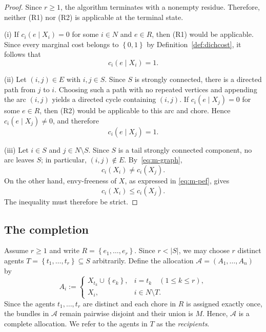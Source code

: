 \documentclass[sigconf,anonymous]{aamas}
\newcommand{\agents}{N}
\newcommand{\items}{M}
\newcommand{\alloc}{\mathcal{A}}
\newcommand{\cost}{c}
\newcommand{\set}[1]{\left\{#1\right\}}
\newcommand{\abs}[1]{\left\lvert#1\right\rvert}
\theoremstyle{acmplain}
\theoremstyle{acmdefinition}
\theoremstyle{acmplain}
\begin{document}
\begin{proof} Since $r\geq 1$, the algorithm terminates with a nonempty residue. Therefore, neither \textnormal{(R1)} nor \textnormal{(R2)} is applicable at the terminal state.

(i) If $\cost_i(e\mid X_i)=0$ for some $i\in\agents$ and $e\in R$, then \textnormal{(R1)} would be applicable. Since every marginal cost belongs to $\set{0,1}$ by Definition~\ref{def:dichcost}, it follows that
\[
    \cost_i(e\mid X_i)=1.
\]

(ii) Let $(i,j)\in E$ with $i,j\in S$. Since $S$ is strongly connected, there is a directed path from $j$ to $i$. Choosing such a path with no repeated vertices and appending the arc $(i,j)$ yields a directed cycle containing $(i,j)$. If $\cost_i(e\mid X_j)=0$ for some $e\in R$, then \textnormal{(R2)} would be applicable to this arc and chore. Hence $\cost_i(e\mid X_j)\neq 0$, and therefore
\[
    \cost_i(e\mid X_j)=1.
\]

(iii) Let $i\in S$ and $j\in\agents\setminus S$. Since $S$ is a tail strongly connected component, no arc leaves $S$; in particular, $(i,j)\notin E$. By~\eqref{eq:m-graph},
\[
    \cost_i(X_i)\neq \cost_i(X_j).
\]
On the other hand, envy-freeness of $X$, as expressed in \eqref{eq:m-pef}, gives
\[
    \cost_i(X_i)\leq \cost_i(X_j).
\]
The inequality must therefore be strict.
\end{proof}
\subsection{The completion}
\label{sec:m-completion}
Assume $r\geq 1$ and write
\(
    R=\set{e_1,\dots,e_r}.
\) Since $r<\abs S$, we may choose $r$ distinct agents \( T=\set{t_1,\dots,t_r}\subseteq S \) arbitrarily. Define the allocation $\alloc=(A_1,\dots,A_n)$ by
\begin{equation}
\label{eq:m-alloc}
  A_i :=
  \begin{cases}
    X_{t_k}\cup\set{e_k}, & i=t_k \quad (1\leq k\leq r),\\[2pt]
    X_i, & i\in\agents\setminus T.
  \end{cases}
\end{equation}
Since the agents $t_1,\dots,t_r$ are distinct and each chore in $R$ is assigned exactly once, the bundles in $\alloc$ remain pairwise disjoint and their union is $\items$. Hence, $\alloc$ is a complete allocation. We refer to the agents in $T$ as the \emph{recipients}.
\end{document}
